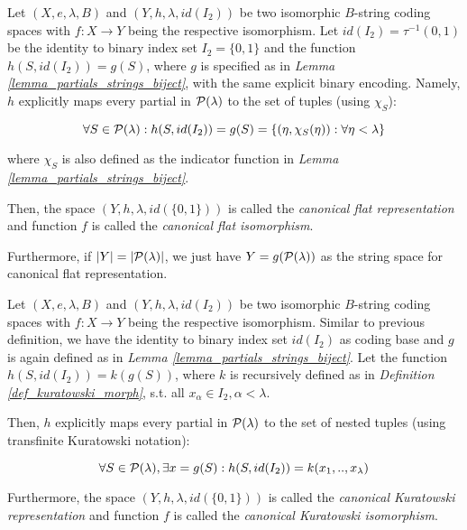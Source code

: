 \begin{definition}\label{def_canonical_flat}
    Let $(X, e, \lambda, B)$ and $(Y, h, \lambda, id(I_2))$ be two isomorphic $B$-string coding spaces with $f: X \to Y$ being the respective isomorphism. Let $id(I_2) = \tau^{-1}(0, 1)$ be the identity to binary index set $I_2 = \{0,1\}$ and the function $h(S, id(I_2)) = g(S)$, where $g$ is specified as in \textit{Lemma \ref{lemma_partials_strings_biject}}, with the same explicit binary encoding. Namely, $h$ explicitly maps every partial in $\mathcal{P}(\lambda)$ to the set of tuples (using $\chi_S$):
    
    \[\forall S \in \mathcal{P}(\lambda): h(S, id(I_2)) = g(S) = \{(\eta, \chi_S(\eta)) : \forall \eta < \lambda \} \]
    
    where $\chi_S$ is also defined as the indicator function in \textit{Lemma \ref{lemma_partials_strings_biject}}.

    Then, the space $(Y, h, \lambda, id(\{0,1\}))$ is called the \textit{canonical flat representation} and function $f$ is called the \textit{canonical flat isomorphism}.
\end{definition}

Furthermore, if $|Y| = |\mathcal{P}(\lambda)|$, we just have $Y = g(\mathcal{P}(\lambda))$ as the string space for canonical flat representation.


\begin{definition}\label{def_canonical_kur}
    Let $(X, e, \lambda, B)$ and $(Y, h, \lambda, id(I_2))$ be two isomorphic $B$-string coding spaces with $f: X \to Y$ being the respective isomorphism. Similar to previous definition, we have the identity to binary index set $id(I_2)$ as coding base and $g$ is again defined as in \textit{Lemma \ref{lemma_partials_strings_biject}}. Let the function $h(S, id(I_2)) = k(g(S))$, where $k$ is recursively defined as in \textit{Definition \ref{def_kuratowski_morph}}, s.t. all $x_\alpha \in I_2, \alpha < \lambda$. 
 
    Then, $h$ explicitly maps every partial in $\mathcal{P}(\lambda)$ to the set of nested tuples (using transfinite Kuratowski notation):
    
    \[\forall S \in \mathcal{P}(\lambda), \exists x = g(S): h(S, id(I_2)) = k(x_1,..,x_\lambda)  \]
    
    Furthermore, the space $(Y, h, \lambda, id(\{0,1\}))$ is called the \textit{canonical Kuratowski representation} and function $f$ is called the \textit{canonical Kuratowski isomorphism}.
\end{definition}

